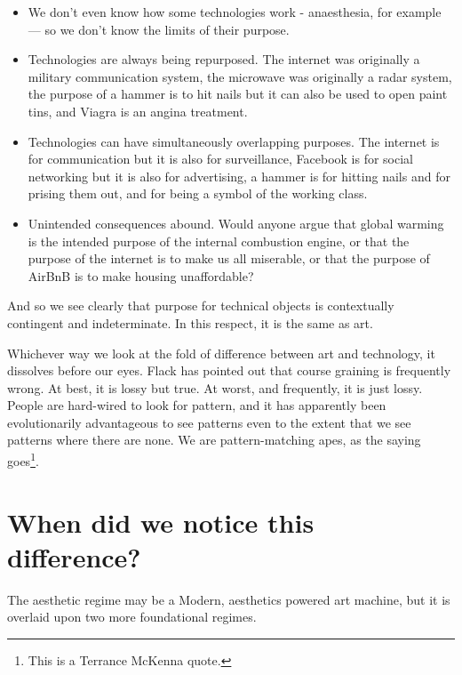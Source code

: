 \documentclass[letterpaper]{article}
\begin{document}
    \begin{itemize}
     
        \item We don't even know how some technologies work - anaesthesia, for example — so we don't know the limits of their purpose.
    
        \item Technologies are always being repurposed. The internet was originally a military communication system, the microwave was originally a radar system, the purpose of a hammer is to hit nails but it can also be used to open paint tins, and Viagra is an angina treatment.

        \item Technologies can have simultaneously overlapping purposes. The internet is for communication but it is also for surveillance, Facebook is for social networking but it is also for advertising, a hammer is for hitting nails and for prising them out, and for being a symbol of the working class.

        \item Unintended consequences abound. Would anyone argue that global warming is the intended purpose of the internal combustion engine, or that the purpose of the internet is to make us all miserable, or that the purpose of AirBnB is to make housing unaffordable?
    \end{itemize}

    And so we see clearly that purpose for technical objects is contextually contingent and indeterminate. In this respect, it is the same as art.

    Whichever way we look at the fold of difference between art and technology, it dissolves before our eyes. Flack has pointed out that course graining is frequently wrong. At best, it is lossy but true. At worst, and frequently, it is just lossy. People are hard-wired to look for pattern, and it has apparently been evolutionarily advantageous to see patterns even to the extent that we see patterns where there are none. We are pattern-matching apes, as the saying goes\footnote{
        This is a Terrance McKenna quote.
    }.

\section{When did we notice this difference?}
    
    The aesthetic regime may be a Modern, aesthetics powered art machine, but it is overlaid upon two more foundational regimes. 
    
\end{document}
